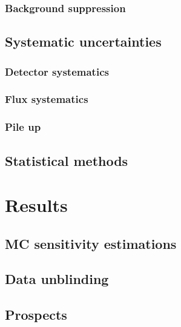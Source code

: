 \documentclass[../main.tex]{subfiles}
\begin{document}
\subsection{Background suppression}
\label{sec:HNL:bg}

\section{Systematic uncertainties}
\subsection{Detector systematics}
\subsection{Flux systematics}
\subsection{Pile up}

\section{Statistical methods}
\label{sec:HNL:stat}


\chapter{Results}
\section{MC sensitivity estimations}

\section{Data unblinding}

\section{Prospects}
\end{document}
